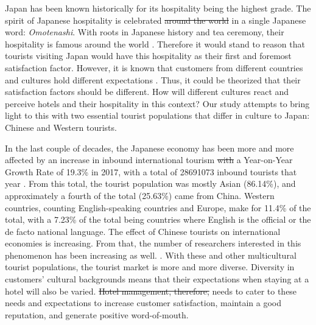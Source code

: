 \documentclass[smallextended,natbib]{svjour3}       %
\providecommand{\DIFadd}[1]{{\protect\color{blue}\uwave{#1}}} %
\providecommand{\DIFdel}[1]{{\protect\color{red}\sout{#1}}}                      %
\providecommand{\DIFaddbegin}{} %
\providecommand{\DIFaddend}{} %
\providecommand{\DIFdelbegin}{} %
\providecommand{\DIFdelend}{} %
\newcommand{\DIFscaledelfig}{0.5}
\newlength{\DIFdelgraphicswidth} %
\newlength{\DIFdelgraphicsheight} %
\newcommand{\DIFaddincludegraphics}[2][]{{\color{blue}\fbox{\DIFOincludegraphics[#1]{#2}}}} %
\newcommand{\DIFdelincludegraphics}[2][]{%
\sbox{\DIFdelgraphicsbox}{\DIFOincludegraphics[#1]{#2}}%
\settoboxwidth{\DIFdelgraphicswidth}{\DIFdelgraphicsbox} %
\settoboxtotalheight{\DIFdelgraphicsheight}{\DIFdelgraphicsbox} %
\scalebox{\DIFscaledelfig}{%
\parbox[b]{\DIFdelgraphicswidth}{\usebox{\DIFdelgraphicsbox}\\[-\baselineskip] \rule{\DIFdelgraphicswidth}{0em}}\llap{\resizebox{\DIFdelgraphicswidth}{\DIFdelgraphicsheight}{%
\setlength{\unitlength}{\DIFdelgraphicswidth}%
\begin{picture}(1,1)%
\thicklines\linethickness{2pt} %
{\color[rgb]{1,0,0}\put(0,0){\framebox(1,1){}}}%
{\color[rgb]{1,0,0}\put(0,0){\line( 1,1){1}}}%
{\color[rgb]{1,0,0}\put(0,1){\line(1,-1){1}}}%
\end{picture}%
}\hspace*{3pt}}} %
} %
\DeclareRobustCommand{\DIFaddbegin}{\DIFOaddbegin \let\includegraphics\DIFaddincludegraphics} %
\DeclareRobustCommand{\DIFaddend}{\DIFOaddend \let\includegraphics\DIFOincludegraphics} %
\DeclareRobustCommand{\DIFdelbegin}{\DIFOdelbegin \let\includegraphics\DIFdelincludegraphics} %
\DeclareRobustCommand{\DIFdelend}{\DIFOaddend \let\includegraphics\DIFOincludegraphics} %
\begin{document}
  Japan has been known historically for its hospitality being the highest grade. The spirit of Japanese hospitality is celebrated \DIFdelbegin \DIFdel{around the world }\DIFdelend \DIFaddbegin \DIFadd{worldwide }\DIFaddend in a single Japanese word: \textit{Omotenashi}. With roots in Japanese history and tea ceremony, their hospitality is famous around the world \cite[][]{al2015characteristics}. Therefore it would stand to reason that tourists visiting Japan would have this hospitality as their first and foremost satisfaction factor. However, it is known that customers from different countries and cultures hold different expectations \cite[][]{engel1990}. Thus, it could be theorized that their satisfaction factors should be different. How will different cultures react and perceive hotels and their hospitality in this context? Our study attempts to bring light to this with two essential tourist populations that differ in culture to Japan: Chinese and Western tourists. 

  In the last couple of decades, the Japanese economy has been more and more affected by an increase in inbound international tourism \cite[][]{jones2009}\DIFdelbegin \DIFdel{with }\DIFdelend \DIFaddbegin \DIFadd{. There was }\DIFaddend a Year-on-Year Growth Rate of 19.3\% in 2017, with a total of \num[group-separator={,}]{28691073} inbound tourists that year \cite[][]{jnto2003-2019}. From this total, the tourist population was mostly Asian (86.14\%), and approximately a fourth of the total (25.63\%) came from China. Western countries, counting English-speaking countries and Europe, make for 11.4\% of the total, with a 7.23\% of the total being countries where English is the official or the de facto national language. The effect of Chinese tourists on international economies is increasing. From that, the number of researchers interested in this phenomenon has been increasing as well. \cite[][]{sun2017}. With these and other multicultural tourist populations, the tourist market is more and more diverse. Diversity in customers' cultural backgrounds means that their expectations when staying at a hotel will also be varied. \DIFdelbegin \DIFdel{Hotel management, therefore, }\DIFdelend \DIFaddbegin \DIFadd{Therefore, Hotel management }\DIFaddend needs to cater to these needs and expectations to increase customer satisfaction, maintain a good reputation, and generate positive word-of-mouth.
\end{document}
